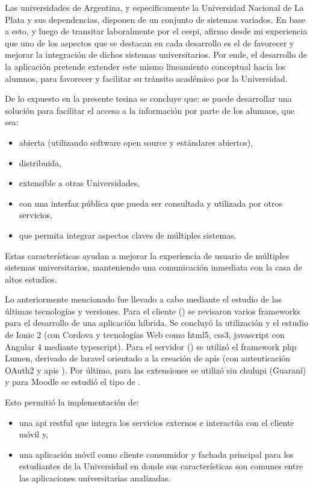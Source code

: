 
Las universidades de Argentina, y específicamente la Universidad Nacional de La Plata y sus dependencias, disponen de un conjunto de sistemas variados. En base a esto, y luego de transitar laboralmente por el \gls{cespi}, afirmo desde mi experiencia que uno de los aspectos que se destacan en cada desarrollo es el de favorecer y mejorar la integración de dichos sistemas universitarios. Por ende, el desarrollo de la aplicación \nombreApp{} pretende extender este mismo lineamiento conceptual hacia los alumnos, para favorecer y facilitar su tránsito académico por la Universidad.

De lo expuesto en la presente tesina se concluye que: se puede desarrollar una solución para facilitar el acceso a la información por parte de los alumnos, que sea:
\begin{itemize}
\item abierta (utilizando software \gls{open source} y estándares abiertos),
\item distribuida,
\item extensible a otras Universidades,
\item con una interfaz pública que pueda ser consultada y utilizada por otros servicios,
\item que permita integrar aspectos claves de múltiples sistemas.
\end{itemize}
Estas características ayudan a mejorar la experiencia de usuario de múltiples sistemas universitarios, manteniendo una comunicación inmediata con la casa de altos estudios.

Lo anteriormente mencionado fue llevado a cabo mediante el estudio de las últimas tecnologías y versiones. Para el cliente () se revisaron varios \glspl{framework} para el desarrollo de una aplicación híbrida. Se concluyó la utilización y el estudio de Ionic 2 (con Cordova y tecnologías Web como \gls{html}5, \gls{css}3, \gls{javascript} con Angular 4 mediante \gls{typescript}). Para el servidor () se utilizó el \gls{framework} \gls{php} Lumen, derivado de \gls{laravel} orientado a la creación de \glspl{api} (con autenticación OAuth2 y \glspl{api} ). Por último, para las extensiones se utilizó \gls{siu} \gls{chulupi} (Guaraní) y para Moodle se estudió el tipo de  .

Esto permitió la implementación de: 
\begin{itemize}
\item una \gls{api} \gls{restful} que integra los servicios externos e interactúa con el cliente móvil y, 
\item una aplicación móvil como cliente consumidor y fachada principal para los estudiantes de la Universidad en donde sus características son comunes entre las aplicaciones universitarias analizadas.
\end{itemize}

